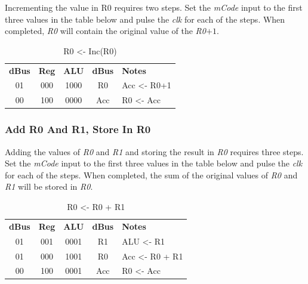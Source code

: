 Incrementing the value in R0 requires two steps. Set the \textit{mCode} input to the first three values in the table below and pulse the \textit{clk} for each of the steps. When completed, \textit{R0} will contain the original value of the \textit{R0}$ +1 $.

\begin{table}[H]
	\sffamily
	\newcommand{\head}[1]{\textcolor{white}{\textbf{#1}}}		
	\begin{center}
		\begin{tabular}{ccccl} 
			\textbf{dBus} & \textbf{Reg} & \textbf{ALU} & \textbf{dBus} & \textbf{Notes} \\
			01 & 000 & 1000 & R0 & Acc <- R0+1 \\
			00 & 100 & 0000 & Acc & R0 <- Acc \\
		\end{tabular}
	\end{center}
	\caption{R0 <- Inc(R0)}
	\label{tab:11-04}
\end{table}

\subsubsection{Add R0 And R1, Store In R0}

Adding the values of \textit{R0} and \textit{R1} and storing the result in \textit{R0} requires three steps. Set the \textit{mCode} input to the first three values in the table below and pulse the \textit{clk} for each of the steps. When completed, the sum of the original values of \textit{R0} and \textit{R1} will be stored in \textit{R0}.

\begin{table}[H]
	\sffamily
	\newcommand{\head}[1]{\textcolor{white}{\textbf{#1}}}		
	\begin{center}
		\begin{tabular}{ccccl} 
			\textbf{dBus} & \textbf{Reg} & \textbf{ALU} & \textbf{dBus} & \textbf{Notes} \\
			01 & 001 & 0001 & R1 & ALU <- R1 \\
			01 & 000 & 1001 & R0 & Acc <- R0 + R1 \\
			00 & 100 & 0001 & Acc & R0 <- Acc 
		\end{tabular}
	\end{center}
	\caption{R0 <- R0 + R1}
	\label{tab:11-05}
\end{table}


